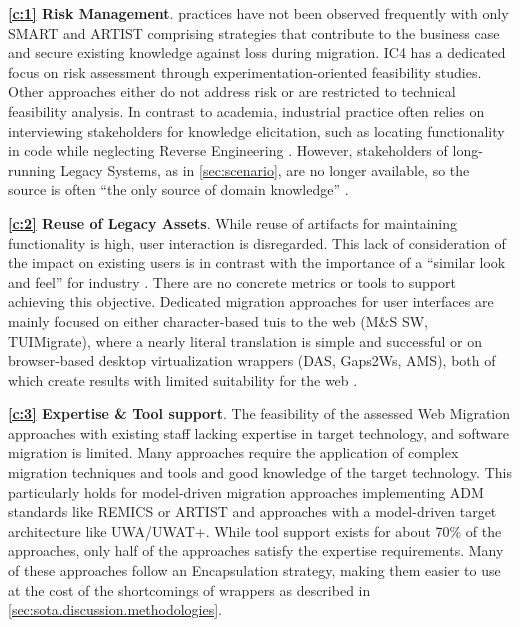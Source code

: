 \textbf{\cref{c:1} Risk Management}.  practices have not been observed frequently with only SMART and ARTIST comprising strategies that contribute to the \gls{business case} and secure existing knowledge against loss during migration.
IC4 has a dedicated focus on risk assessment through experimentation-oriented feasibility studies.
Other approaches either do not address risk or are restricted to technical feasibility analysis.
In contrast to academia, industrial practice often relies on interviewing stakeholders for knowledge elicitation, such as locating functionality in  code while neglecting \gls{Reverse Engineering} \autocite{Razavian2013PHD,Razavian2012}.
However, stakeholders of long-running \glspl{Legacy System}, as in \cref{sec:scenario}, are no longer available, so the  source is often ``the only source of domain knowledge'' \autocite{Bodhuin2002DesktopWebMVC}.

\textbf{\cref{c:2} Reuse of Legacy Assets}. While reuse of  \glspl{artifact} for maintaining functionality is high, user interaction is disregarded.
This lack of consideration of the impact on existing users is in contrast with the importance of a ``similar look and feel'' for industry \autocite{Rodriguez-Echeverria2012MIGRARIA,Lucia2008,Distante2002}.
There are no concrete metrics or tools to support achieving this objective.
Dedicated migration approaches for user interfaces are mainly focused on either character-based \glspl{tui} to the \gls{web} (M\&S SW, TUIMigrate), where a nearly literal translation is simple and successful or on browser-based desktop virtualization wrappers (DAS, Gaps2Ws, AMS), both of which create results with limited suitability for the \gls{web} \autocite{Distante2006a}.

\textbf{\cref{c:3} Expertise \& Tool support}. The feasibility of the assessed \gls{Web Migration} approaches with existing staff lacking expertise in target technology, and software migration is limited.
Many approaches require the application of complex migration techniques and tools and good knowledge of the target technology.
This particularly holds for model-driven migration approaches implementing ADM standards like REMICS or ARTIST and approaches with a model-driven target architecture like UWA/UWAT+.
While tool support exists for about 70\% of the approaches, only half of the approaches satisfy the expertise requirements.
Many of these approaches follow an \gls{Encapsulation} strategy, making them easier to use at the cost of the shortcomings of wrappers as described in \cref{sec:sota.discussion.methodologies}.

